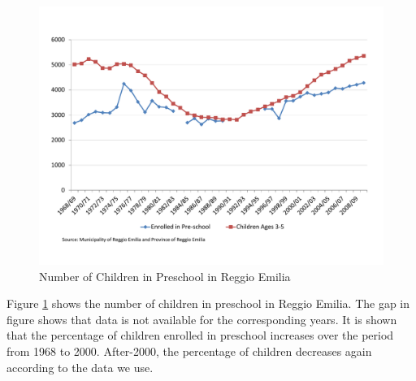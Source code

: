 

\begin{figure}[H] \caption{Number of Children in Preschool in Reggio Emilia} \label{fig:num-children-RE}
	\centering
	\includegraphics[scale=0.65]{../../output/image/Enrollement_Preschool_RE.pdf}
\end{figure}

Figure \ref{fig:num-children-RE} shows the number of children in preschool in Reggio Emilia. The gap in figure shows that data is not available for the corresponding years. It is shown that the percentage of children enrolled in preschool increases over the period from 1968 to 2000. After-2000, the percentage of children decreases again according to the data we use. 





